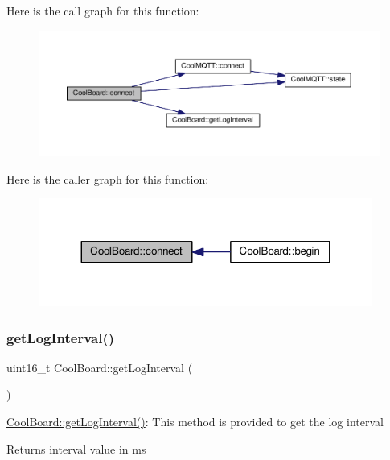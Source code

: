 Here is the call graph for this function\+:
\nopagebreak
\begin{figure}[H]
\begin{center}
\leavevmode
\includegraphics[width=350pt]{classCoolBoard_a519de78b807f8ec6463ff484eb925918_cgraph}
\end{center}
\end{figure}
Here is the caller graph for this function\+:
\nopagebreak
\begin{figure}[H]
\begin{center}
\leavevmode
\includegraphics[width=311pt]{classCoolBoard_a519de78b807f8ec6463ff484eb925918_icgraph}
\end{center}
\end{figure}
\mbox{\label{classCoolBoard_aaa24480b273fc095a1356a589c333781}} 
\subsubsection{\texorpdfstring{get\+Log\+Interval()}{getLogInterval()}}
{\footnotesize\ttfamily uint16\+\_\+t Cool\+Board\+::get\+Log\+Interval (\begin{DoxyParamCaption}{ }\end{DoxyParamCaption})}

\hyperlink{classCoolBoard_aaa24480b273fc095a1356a589c333781}{Cool\+Board\+::get\+Log\+Interval()}\+: This method is provided to get the log interval

\begin{DoxyReturn}{Returns}
interval value in ms 
\end{DoxyReturn}


